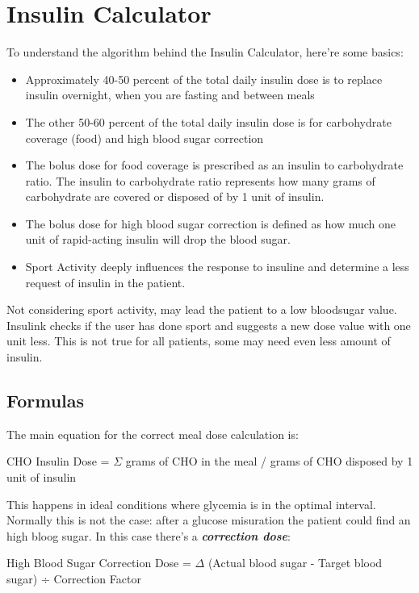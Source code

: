 \documentclass[12pt,hidelinks]{article}
\begin{document}
\section{Insulin Calculator}
\vspace{10.5cm}
To understand the algorithm behind the Insulin Calculator, here're some basics:
\begin{itemize}
 \item  Approximately 40-50 percent of the total daily insulin dose is to replace insulin overnight, when you are fasting and between meals
 \item  The other 50-60 percent of the total daily insulin dose is for carbohydrate coverage (food) and high blood sugar correction
 \item The bolus dose for food coverage is prescribed as an insulin to carbohydrate ratio. The insulin to carbohydrate ratio represents how many grams of carbohydrate are covered or disposed of by 1 unit of insulin.
 \item The bolus dose for high blood sugar correction is defined as how much one unit of rapid-acting insulin will drop the blood sugar.
 \item Sport Activity deeply influences the response to insuline and determine a less request of insulin in the patient.
\end{itemize}
Not considering sport activity, may lead the patient to a low bloodsugar value. 
Insulink checks if the user has done sport and suggests a new dose value with one unit less.
This is not true for all patients, some may need even less amount of insulin.\\
\newpage
\subsection{Formulas}
The main equation for the correct meal dose calculation is:

\begin{center} 
 CHO Insulin Dose = {$\Sigma$} grams of CHO in the meal / grams of CHO disposed by 1 unit of insulin
\end{center}

This happens in ideal conditions where glycemia is in the optimal interval.\\
Normally this is not the case: after a glucose misuration the patient could find an high
bloog sugar. In this case there's a \textbf{\emph{correction dose}}:

\begin{center} 
	High Blood Sugar Correction Dose = {$\Delta$} (Actual blood sugar - Target blood sugar) ÷ Correction Factor
\end{center}
\end{document}
